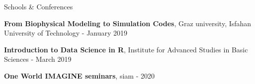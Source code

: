 \documentclass{resume} %
\begin{document}
\begin{rSection}{Schools \& Conferences}	
	\begin{rSubsection}{}{}{}{}
		\item \textbf{From Biophysical Modeling to Simulation Codes}, Graz university, Isfahan University of Technology - January 2019
		\item \textbf{Introduction to Data Science in R}, Institute for Advanced Studies in Basic Sciences - March 2019 %
		\item \textbf{One World IMAGINE seminars}, siam - 2020
	\end{rSubsection}
\end{rSection}
\clearpage \newpage
\end{document}
